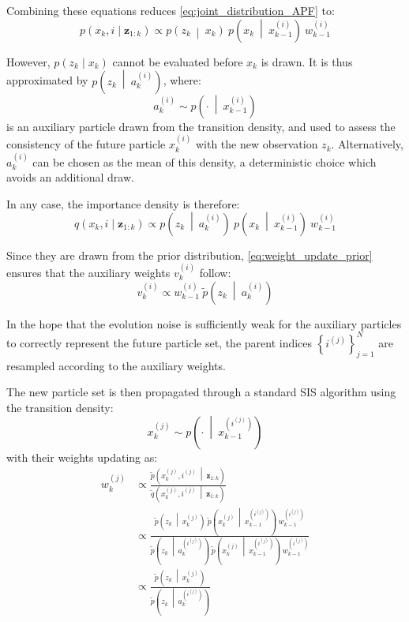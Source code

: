 Combining these equations reduces \eqref{eq:joint_distribution_APF} to:
\begin{equation}
	p(x_k,i\mid\mathbf{z}_{1:k})\propto p\left(z_k\:\middle|\:x_k\right)\:p\left(x_k\:\middle|\:x_{k-1}^{(i)}\right)\:w_{k-1}^{(i)}
\end{equation}

However, $p(z_k\mid x_k)$ cannot be evaluated before $x_k$ is drawn. It is thus approximated by $p\left(z_k\:\middle|\:a_k^{(i)}\right)$, where:
\begin{equation}
	a_k^{(i)}\sim p\left(\cdot\:\middle|\:x_{k-1}^{(i)}\right)
\end{equation}
is an auxiliary particle drawn from the transition density, and used to assess the consistency of the future particle $x_k^{(i)}$ with the new observation $z_k$. Alternatively, $a_k^{(i)}$ can be chosen as the mean of this density, a deterministic choice which avoids an additional draw.

In any case, the importance density is therefore:
\begin{equation}
	q(x_k,i\mid\mathbf{z}_{1:k})\propto p\left(z_k\:\middle|\:a_k^{(i)}\right)\:p\left(x_k\:\middle|\:x_{k-1}^{(i)}\right)\:w_{k-1}^{(i)}
\end{equation}

Since they are drawn from the prior distribution, \eqref{eq:weight_update_prior} ensures that the auxiliary weights $v_k^{(i)}$ follow:
\begin{equation}
	v_k^{(i)}\propto w_{k-1}^{(i)}\:\tilde{p}\left(z_k\:\middle|\:a_k^{(i)}\right)
\end{equation}

In the hope that the evolution noise is sufficiently weak for the auxiliary particles to correctly represent the future particle set, the parent indices $\left\{i^{(j)}\right\}_{j=1}^N$ are resampled according to the auxiliary weights.

The new particle set is then propagated through a standard SIS algorithm using the transition density:
\begin{equation}
	x_k^{(j)}\sim p\left(\cdot\:\middle|\:x_{k-1}^{\left(i^{(j)}\right)}\right)
\end{equation}
with their weights updating as:
\begin{equation}
	\begin{aligned}
	w_k^{(j)}&\propto\frac{\tilde{p}\left(x_k^{(j)},i^{(j)}\:\middle|\:\mathbf{z}_{1:k}\right)}{\tilde{q}\left(x_k^{(j)},i^{(j)}\:\middle|\:\mathbf{z}_{1:k}\right)}\\
	&\propto\frac{\tilde{p}\left(z_k\:\middle|\:x_k^{(j)}\right)\:\tilde{p}\left(x_k^{(j)}\:\middle|\:x_{k-1}^{\left(i^{(j)}\right)}\right)\:w_{k-1}^{\left(i^{(j)}\right)}}{\tilde{p}\left(z_k\:\middle|\:a_k^{\left(i^{(j)}\right)}\right)\:\tilde{p}\left(x_k^{(j)}\:\middle|\:x_{k-1}^{\left(i^{(j)}\right)}\right)\:w_{k-1}^{\left(i^{(j)}\right)}}\\
	&\propto\frac{\tilde{p}\left(z_k\:\middle|\:x_k^{(j)}\right)}{\tilde{p}\left(z_k\:\middle|\:a_k^{\left(i^{(j)}\right)}\right)}
	\end{aligned}
\end{equation}

